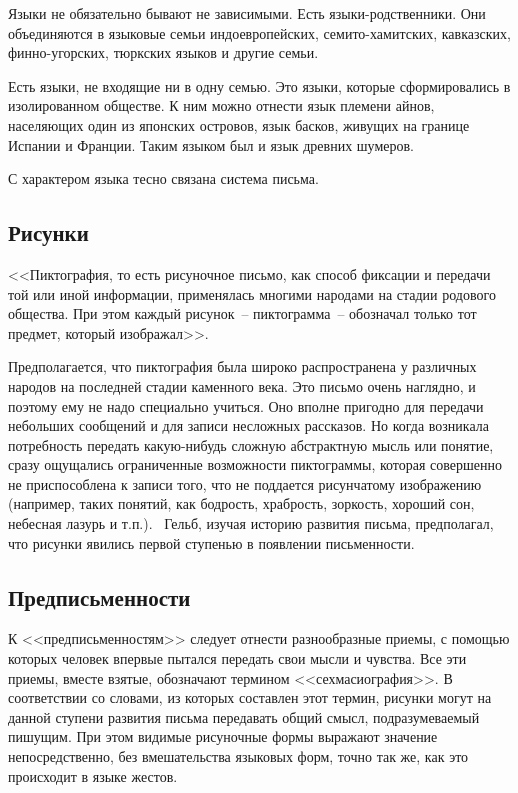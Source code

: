   Языки не обязательно бывают не зависимыми. Есть языки-родственники. Они
  объединяются в языковые семьи индоевропейских, семито-хамитских, кавказских,
  финно-угорских, тюркских языков и другие семьи.
  
  Есть языки, не входящие ни в одну семью. Это языки, которые сформировались в
  изолированном обществе. К ним можно отнести язык племени айнов, населяющих
  один из японских островов, язык басков, живущих на границе Испании и Франции.
  Таким языком был и язык древних шумеров.
  
   С характером языка тесно связана система письма.
    
  \subsection{Рисунки}
  
  <<Пиктография, то есть рисуночное письмо, как способ фиксации и передачи той
  или иной информации, применялась многими народами на стадии родового
  общества. При этом каждый рисунок~-- пиктограмма~-- обозначал только тот
  предмет, который изображал>>\cite{bib:4}.
  
  Предполагается, что пиктография была широко распространена у различных
  народов на последней стадии каменного века. Это письмо очень наглядно, и
  поэтому ему не надо специально учиться. Оно вполне пригодно для передачи
  небольших сообщений и для записи несложных рассказов. Но когда возникала
  потребность передать какую-нибудь сложную абстрактную мысль или понятие,
  сразу ощущались ограниченные возможности пиктограммы, которая совершенно не
  приспособлена к записи того, что не поддается рисунчатому изображению
  (например, таких понятий, как бодрость, храбрость, зоркость, хороший сон,
  небесная лазурь и т.п.).~\cite{bib:5} Гельб, изучая историю развития письма,
  предполагал, что рисунки явились первой ступенью в появлении письменности.
  
  \subsection{Предписьменности}
  
  К <<предписьменностям>> следует отнести разнообразные приемы, с помощью
  которых человек впервые пытался передать свои мысли и чувства. Все эти
  приемы, вместе взятые, обозначают термином <<сехмасиография>>. В соответствии
  со словами, из которых составлен этот термин, рисунки могут на данной ступени
  развития письма передавать общий смысл, подразумеваемый пишущим. При этом
  видимые рисуночные формы выражают значение непосредственно, без вмешательства
  языковых форм, точно так же, как это происходит в языке жестов.
  
